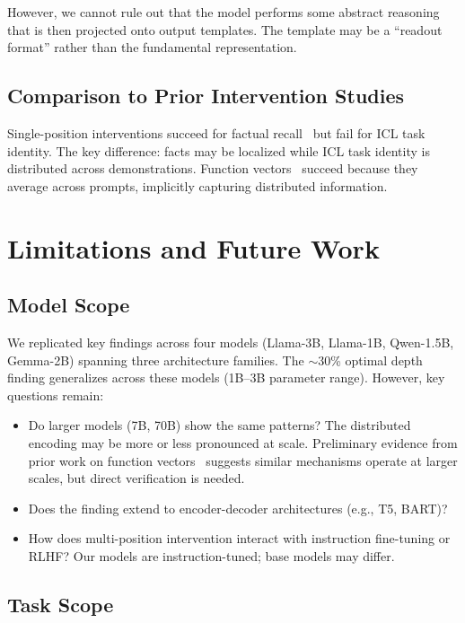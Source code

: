 \documentclass[runningheads]{llncs}
\begin{document}
However, we cannot rule out that the model performs some abstract reasoning that is then projected onto output templates. The template may be a ``readout format'' rather than the fundamental representation.

\subsection{Comparison to Prior Intervention Studies}

Single-position interventions succeed for factual recall~\cite{meng2022locating} but fail for ICL task identity. The key difference: facts may be localized while ICL task identity is distributed across demonstrations. Function vectors~\cite{todd2023function} succeed because they average across prompts, implicitly capturing distributed information.

\section{Limitations and Future Work}
\label{app:limitations}

\subsection{Model Scope}

We replicated key findings across four models (Llama-3B, Llama-1B, Qwen-1.5B, Gemma-2B) spanning three architecture families. The $\sim$30\% optimal depth finding generalizes across these models (1B--3B parameter range). However, key questions remain:
\begin{itemize}
    \item Do larger models (7B, 70B) show the same patterns? The distributed encoding may be more or less pronounced at scale. Preliminary evidence from prior work on function vectors~\cite{todd2023function} suggests similar mechanisms operate at larger scales, but direct verification is needed.
    \item Does the finding extend to encoder-decoder architectures (e.g., T5, BART)?
    \item How does multi-position intervention interact with instruction fine-tuning or RLHF? Our models are instruction-tuned; base models may differ.
\end{itemize}

\subsection{Task Scope}
\end{document}
